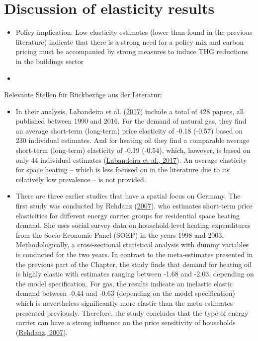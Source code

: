 \documentclass[12pt,twoside]{reedthesis}
\begin{document}
\hypertarget{discussion-of-elasticity-results}{%
\section{Discussion of elasticity results}\label{discussion-of-elasticity-results}}
\begin{itemize}
\item
  Policy implication: Low elasticity estimates (lower than found in the previous literature) indicate that there is a strong need for a policy mix and carbon pricing must be accompanied by strong measures to induce THG reductions in the buildings sector
\item
\end{itemize}
Relevante Stellen für Rückbezüge aus der Literatur:
\begin{itemize}
\item
  In their analysis, Labandeira et al. (\protect\hyperlink{ref-labandeira_etal17}{2017}) include a total of 428 papers, all published between 1990 and 2016. For the demand of natural gas, they find an average short-term (long-term) price elasticity of -0.18 (-0.57) based on 230 individual estimates. And for heating oil they find a comparable average short-term (long-term) elasticity of -0.19 (-0.54), which, however, is based on only 44 individual estimates (\protect\hyperlink{ref-labandeira_etal17}{Labandeira et al., 2017}). An average elasticity for space heating -- which is less focused on in the literature due to its relatively low prevalence -- is not provided.
\item
  There are three earlier studies that have a spatial focus on Germany. The first study was conducted by Rehdanz (\protect\hyperlink{ref-rehdanz07}{2007}), who estimates short-term price elasticities for different energy carrier groups for residential space heating demand. She uses social survey data on household-level heating expenditures from the Socio-Economic Panel (SOEP) in the years 1998 and 2003. Methodologically, a cross-sectional statistical analysis with dummy variables is conducted for the two years. In contrast to the meta-estimates presented in the previous part of the Chapter, the study finds that demand for heating oil is highly elastic with estimates ranging between -1.68 and -2.03, depending on the model specification. For gas, the results indicate an inelastic elastic demand between -0.44 and -0.63 (depending on the model specification) which is nevertheless significantly more elastic than the meta-estimates presented previously. Therefore, the study concludes that the type of energy carrier can have a strong influence on the price sensitivity of households (\protect\hyperlink{ref-rehdanz07}{Rehdanz, 2007}).

\end{itemize}
\end{document}
